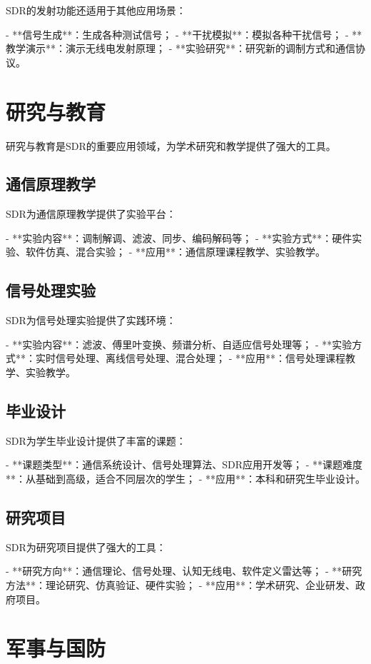 ﻿\documentclass[UTF8]{ctexbook}
\begin{document}
SDR的发射功能还适用于其他应用场景：

- **信号生成**：生成各种测试信号；
- **干扰模拟**：模拟各种干扰信号；
- **教学演示**：演示无线电发射原理；
- **实验研究**：研究新的调制方式和通信协议。

\section{研究与教育}

研究与教育是SDR的重要应用领域，为学术研究和教学提供了强大的工具。

\subsection{通信原理教学}

SDR为通信原理教学提供了实验平台：

- **实验内容**：调制解调、滤波、同步、编码解码等；
- **实验方式**：硬件实验、软件仿真、混合实验；
- **应用**：通信原理课程教学、实验教学。

\subsection{信号处理实验}

SDR为信号处理实验提供了实践环境：

- **实验内容**：滤波、傅里叶变换、频谱分析、自适应信号处理等；
- **实验方式**：实时信号处理、离线信号处理、混合处理；
- **应用**：信号处理课程教学、实验教学。

\subsection{毕业设计}

SDR为学生毕业设计提供了丰富的课题：

- **课题类型**：通信系统设计、信号处理算法、SDR应用开发等；
- **课题难度**：从基础到高级，适合不同层次的学生；
- **应用**：本科和研究生毕业设计。

\subsection{研究项目}

SDR为研究项目提供了强大的工具：

- **研究方向**：通信理论、信号处理、认知无线电、软件定义雷达等；
- **研究方法**：理论研究、仿真验证、硬件实验；
- **应用**：学术研究、企业研发、政府项目。

\section{军事与国防}
\end{document}
